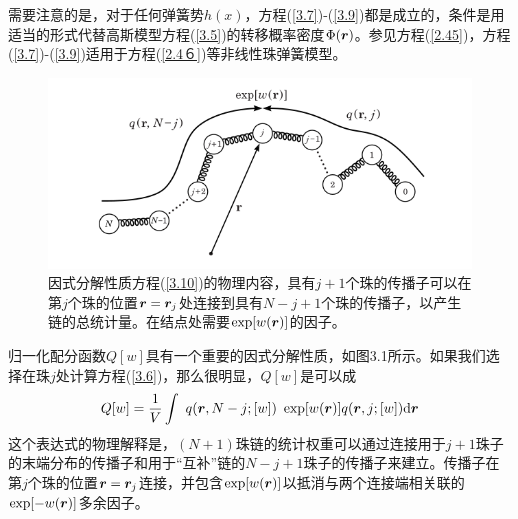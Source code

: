 需要注意的是，对于任何弹簧势$h(x)$，方程(\ref{3.7})-(\ref{3.9})都是成立的，条件是用适当的形式代替高斯模型方程(\ref{3.5})的转移概率密度$\Phi(\bm{r})$。参见方程(\ref{2.45})，方程(\ref{3.7})-(\ref{3.9})适用于方程(\ref{2.4６})等非线性珠弹簧模型。
\begin{figure}[H]
\centering
\includegraphics[scale=0.7]{./figures/Figure_1.png}
\caption{因式分解性质方程(\ref{3.10})的物理内容，具有$j+1$个珠的传播子可以在第$j$个珠的位置$\bm{r}=\bm{r}_j$处连接到具有$N-j+1$个珠的传播子，以产生链的总统计量。在结点处需要$\exp[w(\bm{r})]$的因子。}
\end{figure}
归一化配分函数$Q[w]$具有一个重要的因式分解性质，如图3.1所示。如果我们选择在珠$j$处计算方程(\ref{3.6})，那么很明显，$Q[w]$是可以成
\begin{equation}\label{3.10}
Q[w]=\frac{1}{V}\int~q(\bm{r},N-j;[w])~\exp[w(\bm{r})]q(\bm{r},j;[w])\mathrm{d}\bm{r}
\end{equation}
这个表达式的物理解释是，$(N+1)$珠链的统计权重可以通过连接用于$j+1$珠子的末端分布的传播子和用于“互补”链的$N-j+1$珠子的传播子来建立。传播子在第$j$个珠的位置$\bm{r}=\bm{r}_j$连接，并包含$\exp[w(\bm{r})]$以抵消与两个连接端相关联的$\exp[-w(\bm{r})]$多余因子。


